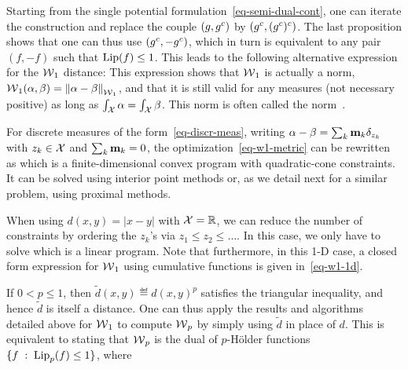 Starting from the single potential formulation~\eqref{eq-semi-dual-cont}, one can iterate the construction and replace the couple $(g,g^c)$ by $(g^c,(g^c)^c)$. The last proposition shows that one can thus use $(g^c,-g^c)$, which in turn is equivalent to any pair $(f,-f)$ such that $\operatorname{Lip}(f) \leq 1$. This leads to the following alternative expression for the $\operatorname{\mathcal{W}}_1$ distance:
This expression shows that $\operatorname{\mathcal{W}}_1$ is actually a norm, \ie $\operatorname{\mathcal{W}}_1(\alpha,\beta) = \left\| \alpha-\beta \right\|_{\operatorname{\mathcal{W}}_1}$, and that it is still valid for any measures (not necessary positive) as long as $\int_{\mathcal{X}} \alpha=\int_{\mathcal{X}} \beta$.  This norm is often called the \citeauthor{kantorovich1958space} norm~\citeyearpar{kantorovich1958space}.

For discrete measures of the form~\eqref{eq-discr-meas}, writing $\alpha-\beta = \sum_{k} \mathrm{\textbf{m}}_k \delta_{z_k}$ with $z_k \in \mathcal{X}$ and $\sum_k \mathrm{\textbf{m}}_k=0$, the optimization~\eqref{eq-w1-metric} can be rewritten as
which is a finite-dimensional convex program with quadratic-cone constraints.  It can be solved using interior point methods or, as we detail next for a similar problem, using proximal methods. 

When using $d(x,y)=|x-y|$ with $\mathcal{X}=\mathbb{R}$, we can reduce the number of constraints by ordering the $z_k$'s via $z_1 \leq z_2 \leq \ldots$.  In this case, we only have to solve
which is a linear program. 
%
Note that furthermore, in this 1-D case, a closed form expression for $\operatorname{\mathcal{W}}_1$ using cumulative functions is given in~\eqref{eq-w1-1d}.

\begin{rem}
	If $0<p \leq 1$, then $\tilde d(x,y) \eqdef d(x,y)^p$ satisfies the triangular inequality, and hence $\tilde d$ is itself a distance. One can thus apply the results and algorithms detailed above for $\operatorname{\mathcal{W}}_1$ to compute $\operatorname{\mathcal{W}}_p$ by simply using $\tilde d$ in place of $d$. This is equivalent to stating that $\operatorname{\mathcal{W}}_p$ is the dual of $p$-H\"older functions $\{ f \;:\; \operatorname{Lip}_p(f) \leq 1 \}$, where
\end{rem}

